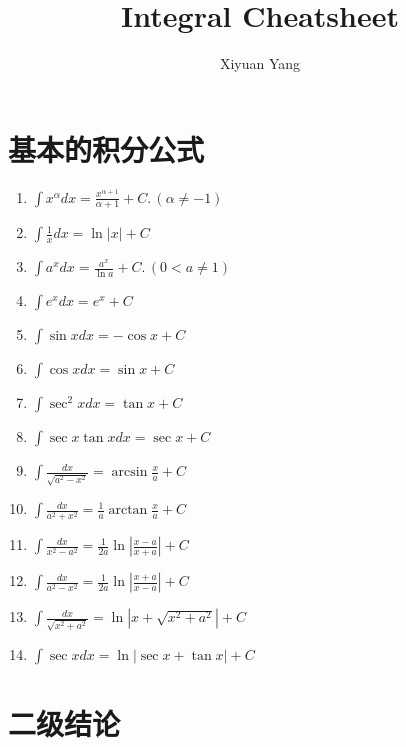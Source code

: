 \documentclass[10pt, a4paper, twocolumn]{article}
\title{Integral Cheatsheet}
\author{Xiyuan Yang}
\begin{document}
\maketitle
\section{基本的积分公式}

\begin{enumerate}
    \item $\int {x^\alpha} dx = \frac{x^{\alpha+1}}{\alpha+1} + C.\,(\alpha \neq -1)$
    \item $\int \frac{1}{x} dx  = \ln{\left | x \right |} + C$
    \item $\int a^x dx = \frac{a^x}{\ln a} + C.\, (0 < a \neq 1)$
    \item $\int e^x dx = e^x +C$
    \item $\int \sin x dx = -\cos x + C$
    \item $\int \cos x dx = \sin x + C$
    \item $\int \sec^2 x dx = \tan x + C$
    \item $\int \sec x \tan x dx = \sec x + C$
    \item $ \int \frac{dx}{\sqrt{a^2 - x^2}} = \arcsin \frac{x}{a} + C$
    \item $\int \frac{dx}{a^2 + x^2} = \frac{1}{a} \arctan \frac{x}{a} + C$
    \item $\int \frac{dx}{x^2 - a^2} = \frac{1}{2a} \ln \left| \frac{x - a}{x + a} \right| + C$
    \item $\int \frac{dx}{a^2 - x^2} = \frac{1}{2a} \ln \left| \frac{x + a}{x - a} \right| + C$
    \item $\int \frac{dx}{\sqrt{x^2 + a^2}} = \ln \left| x + \sqrt{x^2 + a^2} \right| + C$
    \item $\int \sec x dx = \ln |\sec x + \tan x| + C$
\end{enumerate}

\section{二级结论}
\end{document}
